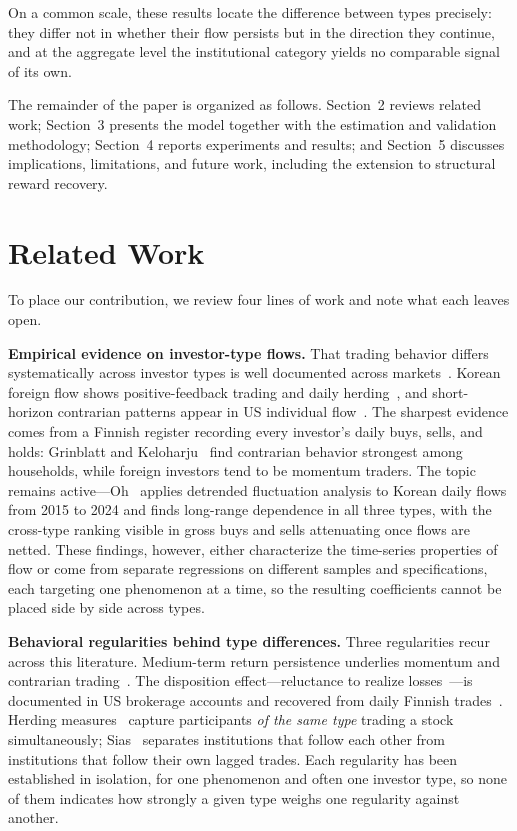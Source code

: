 \documentclass[sigconf,anonymous,review]{acmart}
\begin{document}
On a common scale, these results locate the difference between types
precisely: they differ not in whether their flow persists but in the
direction they continue, and at the aggregate level the institutional
category yields no comparable signal of its own.

The remainder of the paper is organized as follows. Section~2 reviews
related work; Section~3 presents the model together with the estimation
and validation methodology; Section~4 reports experiments and results;
and Section~5 discusses implications, limitations, and future work,
including the extension to structural reward recovery.

\section{Related Work}
\label{sec:related}

To place our contribution, we review four lines of work and note what
each leaves open.

\textbf{Empirical evidence on investor-type flows.} That trading behavior
differs systematically across investor types is well documented across
markets~\cite{choe_kho_stulz,grinblatt_keloharju2001,kaniel_saar_titman}.
Korean foreign flow shows positive-feedback trading and daily
herding~\cite{choe_kho_stulz}, and short-horizon contrarian patterns
appear in US individual flow~\cite{kaniel_saar_titman}. The sharpest
evidence comes from a Finnish register recording every investor's daily
buys, sells, and holds: Grinblatt and
Keloharju~\cite{grinblatt_keloharju2001} find contrarian behavior
strongest among households, while foreign investors tend to be momentum
traders. The topic remains active---Oh~\cite{oh2025} applies detrended
fluctuation analysis to Korean daily flows from 2015 to 2024 and finds
long-range dependence in all three types, with the cross-type ranking
visible in gross buys and sells attenuating once flows are netted. These findings, however, either characterize the
time-series properties of flow or come from separate regressions on
different samples and specifications, each targeting one phenomenon at a
time, so the resulting coefficients cannot be placed side by side across
types.

\textbf{Behavioral regularities behind type differences.} Three
regularities recur across this literature. Medium-term return
persistence underlies momentum and contrarian
trading~\cite{jegadeesh_titman}. The disposition effect---reluctance to
realize losses~\cite{shefrin_statman,odean1998}---is documented in US
brokerage accounts and recovered from daily Finnish
trades~\cite{grinblatt_keloharju2001}. Herding
measures~\cite{lakonishok_shleifer_vishny} capture participants
\emph{of the same type} trading a stock simultaneously;
Sias~\cite{sias2004} separates institutions that follow each other from
institutions that follow their own lagged trades. Each regularity has
been established in isolation, for one phenomenon and often one investor
type, so none of them indicates how strongly a given type weighs one
regularity against another.
\end{document}

